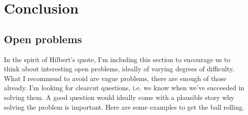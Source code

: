 \section{Conclusion}\label{conclusion}



\subsection{Open problems} In the spirit of Hilbert's quote, I'm including this
section to encourage us to think about interesting open problems,
ideally of varying degrees of difficulty. What I recommend to avoid
are vague problems, there are enough of those already. I'm looking for
clearcut questions, i.e. we know when we've succeeded in solving them.
A good question would ideally come with a plausible story why solving
the problem is important.  Here are some examples to get the ball
rolling.

